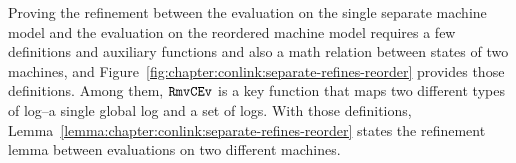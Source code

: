 Proving the refinement between the evaluation on the single separate machine model and the 
evaluation on the reordered machine model 
requires a few definitions and auxiliary  functions and also a math relation between states of two machines,
and Figure~\ref{fig:chapter:conlink:separate-refines-reorder} provides those definitions. 
Among them, ${{\mathrm{\texttt{RmvCEv}}}}$ is a key function that maps two different types of log--a single global log and a set of logs. 
With those definitions, 
Lemma~\ref{lemma:chapter:conlink:separate-refines-reorder} states 
the refinement lemma between evaluations on two different machines.

%
%



